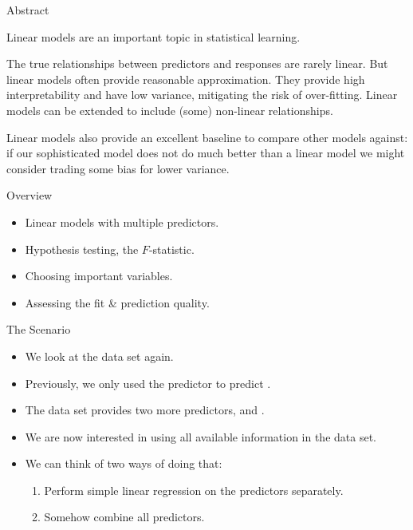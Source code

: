 \documentclass[mathserif, aspectratio=169]{beamer}
\subtitle{\bfseries%
  {Linear Regression, Part 2}\\%
  {\tiny\it multiple linear regression, hypothesis testing, important variables, fit quality, predictions}\\%
}
\begin{document}


\begin{frame}{Abstract}

	\begin{blurb}
		Linear models are an important topic in statistical learning.  

		The true relationships between predictors and responses are rarely linear.
		But linear models often provide reasonable approximation. They provide
		high interpretability and have low variance, mitigating the risk of over-fitting.
		Linear models can be extended to include (some) non-linear relationships. 

		Linear models also provide an excellent baseline to compare other models against: if 
		our sophisticated model does not do much better than a linear model we might consider
		trading some bias for lower variance.
	\end{blurb}
\end{frame}

\begin{frame}{Overview}
	\begin{itemize}
		\item Linear models with multiple predictors.
		\item Hypothesis testing, the $F$-statistic.
		\item Choosing important variables.
		\item Assessing the fit \& prediction quality.
	\end{itemize}
\end{frame}

\begin{frame}{The Scenario}
	\begin{itemize}
		\item We look at the  data set again.
		\item Previously, we only used the  predictor to predict .
		\item The data set provides two more predictors,  and .
		\item We are now interested in using all available information in the data set.
		\item We can think of two ways of doing that:
			\begin{cpage}
				\begin{enumerate}
					\item Perform simple linear regression on the predictors separately.
					\item Somehow combine all predictors.
				\end{enumerate}
			\end{cpage}
	\end{itemize}
\end{frame}
\end{document}
